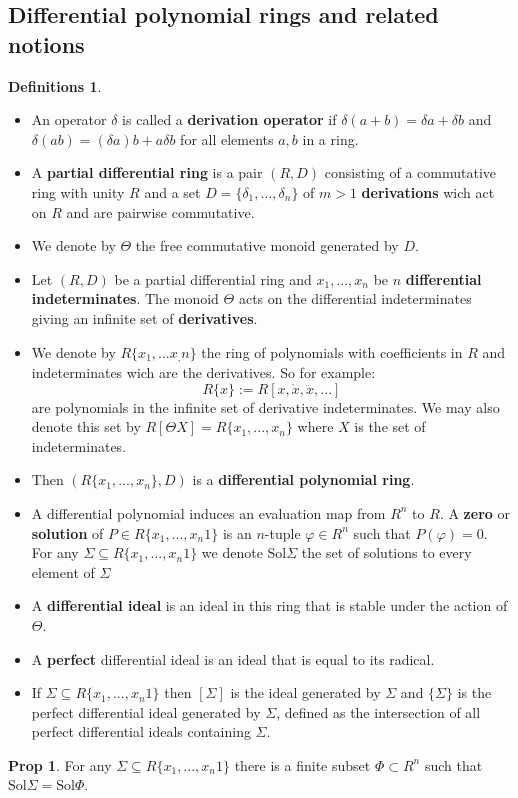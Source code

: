 \documentclass{article}
\theoremstyle{definition}
\newtheorem*{prop}{Prop}
\newtheorem*{defns}{Definitions}
\newcommand{\Sol}{\text{Sol}}
\begin{document}
\subsection{Differential polynomial rings and related notions}
\begin{defns}\leavevmode
\begin{itemize}
    \item An operator $\delta$ is called a \textbf{derivation operator} if $\delta(a+b)=\delta a+\delta b$ and $\delta(ab)=(\delta a)b+a\delta b$ for all elements $a,b$ in a ring.
    \item A \textbf{partial differential ring} is a pair $(R,D)$ consisting of a commutative ring with unity $R$ and a set $D=\{\delta_1,...,\delta_n\}$ of $m>1$ \textbf{derivations} wich act on $R$ and are pairwise commutative.
    \item We denote by $\Theta$ the free commutative monoid generated by $D$.
    \item Let $(R,D)$ be a partial differential ring and $x_1,...,x_n$ be $n$ \textbf{differential indeterminates}. The monoid $\Theta$ acts on the differential indeterminates giving an infinite set of \textbf{derivatives}.
    \item We denote by $R\{x_1,...x_,n\}$ the ring of polynomials with coefficients in $R$ and indeterminates wich are the derivatives. So for example:
    $$R\{x\}:= R[x,\dot{x},\ddot x,...]$$
    are polynomials in the infinite set of derivative indeterminates. We may also denote this set by $R[\Theta X]=R\{x_1,...,x_n\}$ where $X$ is the set of indeterminates.
    \item Then $(R\{x_1,...,x_n\},D)$ is a \textbf{differential polynomial ring}.
    \item A differential polynomial induces an evaluation map from $R^n$ to $R$. A \textbf{zero} or \textbf{solution} of $P\in R\{x_1,...,x_n1\}$ is an $n$-tuple $\varphi\in R^n$ such that $P(\varphi)=0$. For any $\Sigma\subseteq R\{x_1,...,x_n1\}$ we denote $\Sol\Sigma$ the set of solutions to every element of $\Sigma$
    \item A \textbf{differential ideal} is an ideal in this ring that is stable under the action of $\Theta$.
    \item A \textbf{perfect} differential ideal is an ideal that is equal to its radical.
    \item  If $\Sigma\subseteq R\{x_1,...,x_n1\}$ then $[\Sigma]$ is the ideal generated by $\Sigma$ and $\{\Sigma\}$ is the perfect differential ideal generated by $\Sigma$, defined as the intersection of all perfect differential ideals containing $\Sigma$.
\end{itemize}
\end{defns}
\begin{prop}
    For any $\Sigma\subseteq R\{x_1,...,x_n1\}$ there is a finite subset $\Phi\subset R^n$ such that $\Sol\Sigma=\Sol\Phi$.
\end{prop}
\end{document}
